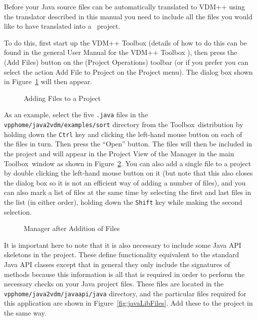 \documentclass[\pformat,12pt]{article}
\newcommand{\ToolboxName}{VDM++ Toolbox}
\newcommand{\Toolbox}{Toolbox}
\newcommand{\vdmhome}{vpphome}
\newcommand{\cmd}{\tt }
\newcommand{\guicmd}[1]{{\sf #1}}
\begin{document}
Before your Java source files can be automatically translated to VDM++
using the translator described in this manual you need to include all
the files you would like to have translated into a \VDMTools\
project. 

To do this, first start up the \ToolboxName{} (details of how to do
this can be found in the general User Manual for the VDM++
Toolbox \cite{UserManPP-CSK}), then press the 
(\guicmd{Add Files}) button on the (\guicmd{Project Operations})
toolbar (or if you prefer you can select the action \guicmd{Add File
  to Project} on the \guicmd{Project} menu). The dialog box shown
in Figure~\ref{fig:addJavaFiles} will then appear. 

\begin{figure}[tbh]
\begin{center}
\mbox{}
\caption{Adding Files to a Project\label{fig:addJavaFiles}}
\end{center}
\end{figure}

As an example, select the five {\tt .java} files in the 
{\tt \vdmhome/java2vdm/examples/sort} directory from the
\Toolbox\ distribution by holding down the {\cmd Ctrl} key and
clicking the left-hand mouse button on each of the 
files in turn. Then press the ``Open'' button. The files will then
be included in the project and will appear in the \guicmd{Project View}
of the \guicmd{Manager} in the main \Toolbox\ window as
shown in Figure~\ref{fig:addedJavaFiles}. You can also add a single
file to a project by double clicking the left-hand mouse button on it
(but note that this also closes the dialog box so it is not an
efficient way of adding a number of files), and you can also mark a
list of files at the same time by selecting the first and last files
in the list (in either order), holding down the {\cmd Shift} key while
making the second selection. 

\begin{figure}[tbh]
\begin{center}
\caption{Manager after Addition of Files}\label{fig:addedJavaFiles}
\end{center}
\end{figure}

It is important here to note that it is also necessary to include some
Java API skeletons in the project. These define functionality
equivalent to the standard Java API classes except that in general
they only include the signatures of methods because this information
is all that is required in order to perform the necessary checks on
your Java project files. These files are located in the {\tt
  \vdmhome/java2vdm/javaapi/java} directory, and the particular files
required for this application are shown in
Figure~\ref{fig:javaLibFiles}. Add these to the 
project in the same way.
\end{document}
